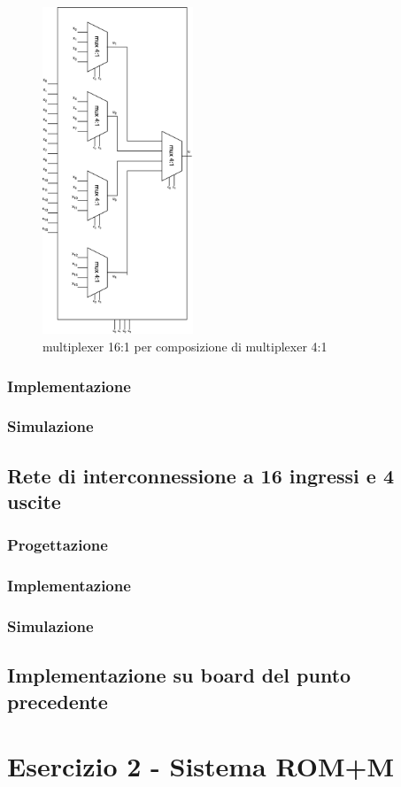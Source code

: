 \begin{figure}[H]
	\centering
	\includegraphics[width=0.4\textwidth]{img/05}
	\caption{multiplexer 16:1 per composizione di multiplexer 4:1}
	\label{mux_16:1_comp} 
\end{figure}

\subsection{Implementazione}

\subsection{Simulazione}

\section{Rete di interconnessione a 16 ingressi e 4 uscite}

\subsection{Progettazione}

\subsection{Implementazione}

\subsection{Simulazione}

\section{Implementazione su board del punto precedente}

\chapter{Esercizio 2 - Sistema ROM+M}


